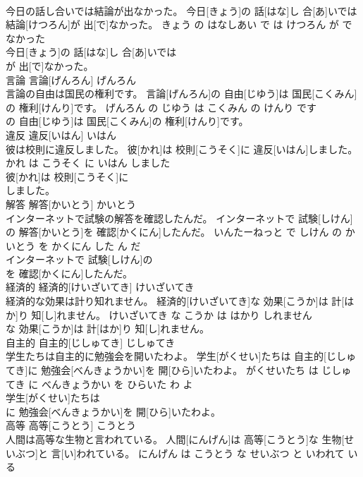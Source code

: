 \documentclass[8pt]{extreport}
\begin{document}
\begin{CJK}{UTF8}{min}
\\	今日の話し合いでは結論が出なかった。	今日[きょう]の 話[はな]し 合[あ]いでは 結論[けつろん]が 出[で]なかった。	きょう の はなしあい で は けつろん が でなかった	
\\	今日[きょう]の 話[はな]し 合[あ]いでは
\\	が 出[で]なかった。			
\\	言論	言論[げんろん]	げんろん	
\\	言論の自由は国民の権利です。	言論[げんろん]の 自由[じゆう]は 国民[こくみん]の 権利[けんり]です。	げんろん の じゆう は こくみん の けんり です	
\\	の 自由[じゆう]は 国民[こくみん]の 権利[けんり]です。			
\\	違反	違反[いはん]	いはん	
\\	彼は校則に違反しました。	彼[かれ]は 校則[こうそく]に 違反[いはん]しました。	かれ は こうそく に いはん しました	
\\	彼[かれ]は 校則[こうそく]に
\\	しました。			
\\	解答	解答[かいとう]	かいとう	
\\	インターネットで試験の解答を確認したんだ。	インターネットで 試験[しけん]の 解答[かいとう]を 確認[かくにん]したんだ。	いんたーねっと で しけん の かいとう を かくにん した ん だ	
\\	インターネットで 試験[しけん]の
\\	を 確認[かくにん]したんだ。			
\\	経済的	経済的[けいざいてき]	けいざいてき	
\\	経済的な効果は計り知れません。	経済的[けいざいてき]な 効果[こうか]は 計[はか]り 知[し]れません。	けいざいてき な こうか は はかり しれません	
\\	な 効果[こうか]は 計[はか]り 知[し]れません。			
\\	自主的	自主的[じしゅてき]	じしゅてき	
\\	学生たちは自主的に勉強会を開いたわよ。	学生[がくせい]たちは 自主的[じしゅてき]に 勉強会[べんきょうかい]を 開[ひら]いたわよ。	がくせいたち は じしゅてき に べんきょうかい を ひらいた わ よ	
\\	学生[がくせい]たちは
\\	に 勉強会[べんきょうかい]を 開[ひら]いたわよ。			
\\	高等	高等[こうとう]	こうとう	
\\	人間は高等な生物と言われている。	人間[にんげん]は 高等[こうとう]な 生物[せいぶつ]と 言[い]われている。	にんげん は こうとう な せいぶつ と いわれて いる	

\end{CJK}
\end{document}
